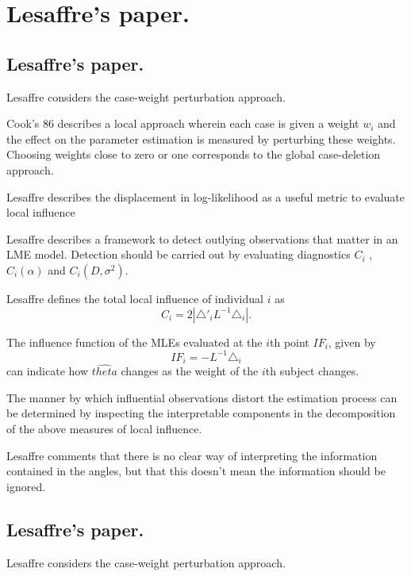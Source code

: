 \documentclass[12pt, a4paper]{report}
\theoremstyle{plain}
\theoremstyle{definition}
\theoremstyle{remark}
\begin{document}
	
	
	\chapter{Lesaffre's paper.}
	\section{Lesaffre's paper.} %
	
	Lesaffre considers the case-weight perturbation approach.
	
	
	Cook's 86 describes a local approach wherein each case is given a weight $w_{i}$ and the effect on the parameter estimation is measured by perturbing these weights. Choosing weights close to zero or one corresponds to the global case-deletion approach.
	
	Lesaffre  describes the displacement in log-likelihood as a useful metric to evaluate local influence %
	
	
	Lesaffre describes a framework to detect outlying observations that matter in an LME model. Detection should be carried out by evaluating diagnostics $C_{i}$ , $C_{i}(\alpha)$ and $C_{i}(D,\sigma^2)$.
	
	
	Lesaffre defines the total local influence of individual $i$ as
	\begin{equation}
	C_{i} = 2 | \triangle \prime _{i} L^{-1} \triangle_{i}|.
	\end{equation}
	
	
	The influence function of the MLEs evaluated at the $i$th point $IF_{i}$, given by
	\begin{equation}
	IF_{i} = -L^{-1}\triangle _{i}
	\end{equation}
	can indicate how $\hat{theta}$ changes as the weight of the $i$th
	subject changes.
	
	The manner by which influential observations distort the estimation process can be determined by inspecting the
	interpretable components in the decomposition of the above measures of local influence.
	
	
	Lesaffre comments that there is no clear way of interpreting the information contained in the angles, but that this doesn't mean the information should be ignored.
	
	
	
	
	\section{Lesaffre's paper.}
	Lesaffre considers the case-weight perturbation approach.
	
\end{document}
